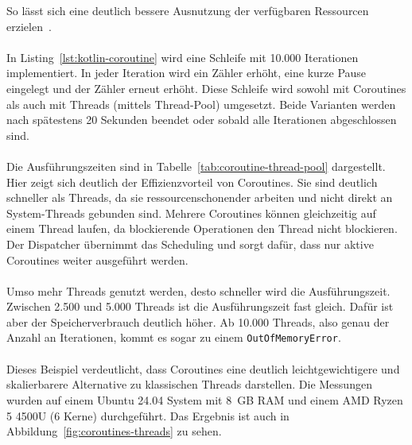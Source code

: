 \documentclass[11pt]{article}
\begin{document}
    So lässt sich eine deutlich bessere Ausnutzung der verfügbaren Ressourcen erzielen~\cite[194]{kotlin-patterns}.\\
    \\
    In Listing~\ref{lst:kotlin-coroutine} wird eine Schleife mit 10.000 Iterationen implementiert.
    In jeder Iteration wird ein Zähler erhöht, eine kurze Pause eingelegt und der Zähler erneut erhöht.
    Diese Schleife wird sowohl mit Coroutines als auch mit Threads (mittels Thread-Pool) umgesetzt.
    Beide Varianten werden nach spätestens 20 Sekunden beendet oder sobald alle Iterationen abgeschlossen sind.\\
    \\
    Die Ausführungszeiten sind in Tabelle~\ref{tab:coroutine-thread-pool} dargestellt.
    Hier zeigt sich deutlich der Effizienzvorteil von Coroutines.
    Sie sind deutlich schneller als Threads, da sie ressourcenschonender arbeiten und nicht direkt an System-Threads gebunden sind.
    Mehrere Coroutines können gleichzeitig auf einem Thread laufen, da blockierende Operationen den Thread nicht blockieren.
    Der Dispatcher übernimmt das Scheduling und sorgt dafür, dass nur aktive Coroutines weiter ausgeführt werden.\\
    \\
    Umso mehr Threads genutzt werden, desto schneller wird die Ausführungszeit.
    Zwischen 2.500 und 5.000 Threads ist die Ausführungszeit fast gleich.
    Dafür ist aber der Speicherverbrauch deutlich höher.
    Ab 10.000 Threads, also genau der Anzahl an Iterationen, kommt es sogar zu einem \texttt{OutOfMemoryError}.\\
    \\
    Dieses Beispiel verdeutlicht, dass Coroutines eine deutlich leichtgewichtigere und skalierbarere Alternative zu klassischen Threads darstellen.
    Die Messungen wurden auf einem Ubuntu 24.04 System mit 8~GB RAM und einem AMD Ryzen 5 4500U (6 Kerne) durchgeführt.
    Das Ergebnis ist auch in Abbildung~\ref{fig:coroutines-threads} zu sehen.\\
    \\
\end{document}
